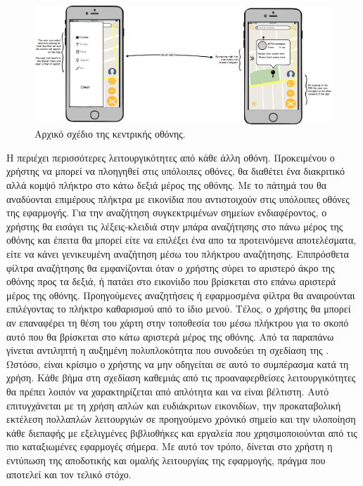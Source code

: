 \begin{figure}[H]
    \centering
    \includegraphics[scale=0.22]{figures/home.png}
    \caption{Αρχικό σχέδιο της κεντρικής οθόνης.}
    \label{homemockup}
\end{figure}

\indent
Η  περιέχει περισσότερες λειτουργικότητες από κάθε άλλη οθόνη. Προκειμένου ο χρήστης να μπορεί να πλοηγηθεί στις υπόλοιπες οθόνες, θα διαθέτει ένα διακριτικό αλλά κομψό πλήκτρο στο κάτω δεξιά μέρος της οθόνης. Με το πάτημά του θα αναδύονται επιμέρους πλήκτρα με εικονίδια που αντιστοιχούν στις υπόλοιπες οθόνες της εφαρμογής. Για την αναζήτηση συγκεκτριμένων σημείων ενδιαφέροντος, ο χρήστης θα εισάγει τις λέξεις-κλειδιά στην μπάρα αναζήτησης στο πάνω μέρος της οθόνης και έπειτα θα μπορεί είτε να επιλέξει ένα απο τα προτεινόμενα αποτελέσματα, είτε να κάνει γενικευμένη αναζήτηση μέσω του πλήκτρου αναζήτησης. Επιπρόσθετα φίλτρα αναζήτησης θα εμφανίζονται όταν ο χρήστης σύρει το αριστερό άκρο της οθόνης προς τα δεξιά, ή πατάει στο εικονίιδο που βρίσκεται στο επάνω αριστερά μέρος της οθόνης. Προηγούμενες αναζητήσεις ή εφαρμοσμένα φίλτρα θα αναιρούνται επιλέγοντας το πλήκτρο καθαρισμού από το ίδιο μενού. Τέλος, ο χρήστης θα μπορεί αν επαναφέρει τη θέση του χάρτη στην τοποθεσία του μέσω πλήκτρου για το σκοπό αυτό που θα βρίσκεται στο κάτω αριστερά μέρος της οθόνης. 
\newline
\indent
Από τα παραπάνω γίνεται αντιληπτή η αυξημένη πολυπλοκότητα που συνοδεύει τη σχεδίαση της . Ωστόσο, είναι κρίσιμο ο χρήστης να μην οδηγείται σε αυτό το συμπέρασμα κατά τη χρήση. Κάθε βήμα στη σχεδίαση καθεμιάς από τις προαναφερθείσες λειτουργικότητες θα πρέπει λοιπόν να χαρακτηρίζεται από απλότητα και να είναι βέλτιστη. Αυτό επιτυγχάνεται με τη χρήση απλών και ευδιάκριτων εικονιδίων, την προκαταβολική εκτέλεση πολλαπλών λειτουργιών σε προηγούμενο χρόνικό σημείο και την υλοποίηση κάθε διεπαφής με εξελιγμένες βιβλιοθήκες και εργαλεία που χρησιμοποιούνται από τις πιο καταξιωμένες εφαρμογές σήμερα. Με αυτό τον τρόπο, δίνεται στο χρήστη η εντύπωση της αποδοτικής και ομαλής λειτουργίας της εφαρμογής, πράγμα που αποτελεί και τον τελικό στόχο.


